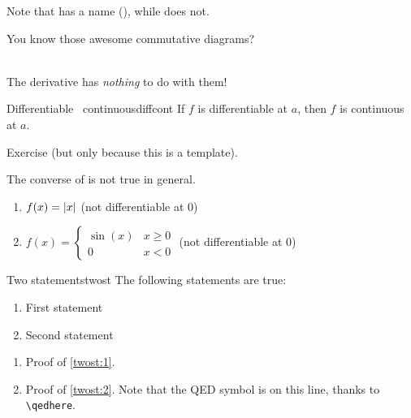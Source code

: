 \documentclass[10pt]{extarticle}
\makeatletter
\newcommand{\<}{\langle}
\renewcommand{\>}{\rangle}
\renewcommand{\implies}{\@ifstar{\ensuremath{\Longrightarrow}}{\ensuremath{\Rightarrow}}} %
\renewenvironment{proof}[1][\proofname] {\par\pushQED{\qed}{\normalfont\sffamily\bfseries\topsep6\p@\@plus6\p@\relax #1\@addpunct{.} }}{\popQED\endtrivlist\@endpefalse}
\theoremstyle{mystyle}{\newtheorem*{remark}{Remark}}
\theoremstyle{mystyle}{\newtheorem*{remarks}{Remarks}}
\theoremstyle{mystyle}{\newtheorem*{example}{Example}}
\theoremstyle{mystyle}{\newtheorem*{examples}{Examples}}
\theoremstyle{definition}{\newtheorem*{exercise}{Exercise}}
\theoremstyle{warn}
\makeatother
\begin{document}
Note that  has a name (), while  does not.

\begin{center}
You know those awesome commutative diagrams?\\
\\
The derivative has \emph{nothing} to do with them!
\end{center}

\begin{proposition}{Differentiable \implies\ continuous}{diffcont}
If $f$ is differentiable at $a$, then $f$ is continuous at $a$.
\end{proposition}
\begin{proof}
Exercise (but only because this is a template).
\end{proof}

The converse of  is not true in general.

\begin{examples}\leavevmode %
\begin{enumerate}
    \item $f(x)=\abs{x}$ \hfill (not differentiable at $0$)
    \item $f(x)=\begin{cases} \sin(x) & x\ge 0 \\ 0 & x<0 \end{cases}$ \hfill (not differentiable at $0$)
\end{enumerate}
\end{examples}

\begin{theorem}{Two statements}{twost}
The following statements are true:
\begin{enumerate}[ref={(\arabic*)}]
    \item\label{twost:1} First statement
    \item\label{twost:2} Second statement
\end{enumerate}
\end{theorem}
\begin{proof}%
\begin{enumerate}
    \item Proof of \ref{twost:1}.
    \item Proof of \ref{twost:2}. Note that the QED symbol is on this line, thanks to \verb!\qedhere!. \qedhere %
\end{enumerate}
\end{proof}
\end{document}
